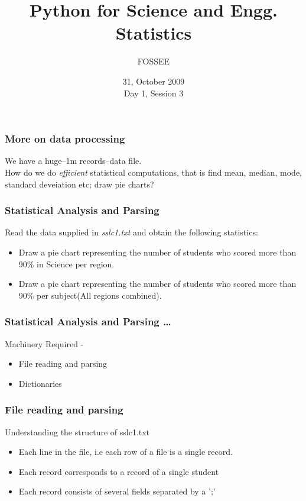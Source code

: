 \documentclass[14pt,compress]{beamer}
\title[Statistics]{Python for Science and Engg. Statistics}
\author[FOSSEE] {FOSSEE}
\institute[IIT Bombay] {Department of Aerospace Engineering\\IIT Bombay}
\date[] {31, October 2009\\Day 1, Session 3}
\begin{document}
\begin{frame}
  \maketitle
\end{frame}


\begin{frame}
  \frametitle{More on data processing}
  \begin{block}{}
    We have a huge--1m records--data file.\\How do we do \emph{efficient} statistical computations, that is find mean, median, mode, standard deveiation etc; draw pie charts?
  \end{block}
\end{frame}


\begin{frame}
  \frametitle{Statistical Analysis and Parsing}
  Read the data supplied in \emph{sslc1.txt} and obtain the following statistics:
  \begin{itemize}
    \item Draw a pie chart representing the number of students who scored more than 90\% in Science per region.
    \item Draw a pie chart representing the number of students who scored more than 90\% per subject(All regions combined).
  \end{itemize}
\end{frame}

\begin{frame}
  \frametitle{Statistical Analysis and Parsing \ldots}
  Machinery Required -
  \begin{itemize}
    \item File reading and parsing
    \item Dictionaries
  \end{itemize}
\end{frame}

\begin{frame}
  \frametitle{File reading and parsing}
  Understanding the structure of sslc1.txt
  \begin{itemize}
    \item Each line in the file, i.e each row of a file is a single record.
    \item Each record corresponds to a record of a single student
    \item Each record consists of several fields separated by a ';'
  \end{itemize}
\end{frame}
\end{document}
